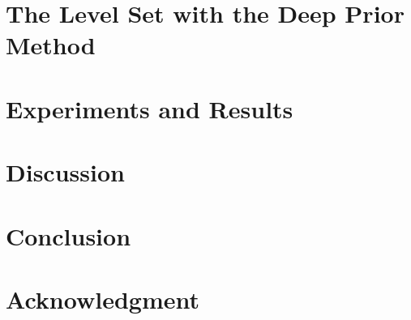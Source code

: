 \documentclass[journal]{IEEEtran}
\begin{document}
\section{The Level Set with the Deep Prior Method}\label{sec:Propsed Work}



\section{Experiments and Results}\label{sec:Experiments and Results}



\section{Discussion}\label{sec:Discussion}



\section{Conclusion}\label{sec:Conclusion and Future Work}



\section*{Acknowledgment}\label{sec:Acknowledgment}




\ifCLASSOPTIONcaptionsoff
  \newpage
\fi




% 

\end{document}
